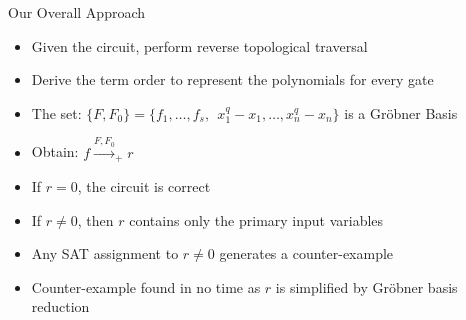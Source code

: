 \documentclass[xcolor=dvipsnames]{beamer}
\begin{document}
\begin{frame}{Our  Overall Approach}

\begin{itemize}
\item Given the circuit, perform reverse topological traversal
\item Derive the term order to represent the polynomials for every gate
\item The set: $\{F, F_0\} = \{f_1, \dots, f_s, ~~x_1^q - x_1, \dots, x_n^q -
  x_n\}$ is a Gr\"obner Basis
\item Obtain: $f \stackrel{F, F_0}{\textstyle\longrightarrow}_+ r$
\item If $r = 0$, the circuit is correct
\item If $r \neq 0$, then $r$ contains only the \alert{primary input
    variables}
\item Any SAT assignment to $r\neq 0$ generates a counter-example
\item Counter-example found in no time as $r$ is simplified by Gr\"obner basis reduction
\end{itemize}

\end{frame}




\end{document}

